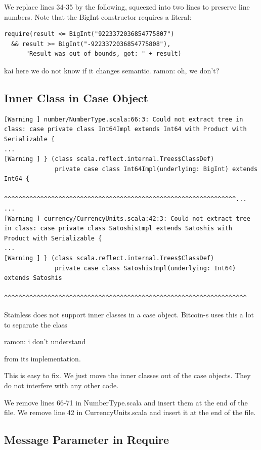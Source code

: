 \documentclass[runningheads]{llncs}
\newcommand{\todo}[1]{{\par \color{red}#1}}
\begin{document}
We replace lines 34-35 by the following, squeezed into two lines to
preserve line numbers. Note that the BigInt constructor requires a
literal:

\begin{lstlisting}[style=scala]
require(result <= BigInt("9223372036854775807")  
  && result >= BigInt("-9223372036854775808"),
      "Result was out of bounds, got: " + result)
\end{lstlisting}


\todo{kai here we do not know if it changes semantic. ramon: oh, we don't?}



\subsection{Inner Class in Case Object}

\begin{lstlisting}[style=stainless]
[Warning ] number/NumberType.scala:66:3: Could not extract tree in class: case private class Int64Impl extends Int64 with Product with Serializable {
...
[Warning ] } (class scala.reflect.internal.Trees$ClassDef)
              private case class Int64Impl(underlying: BigInt) extends Int64 {
              ^^^^^^^^^^^^^^^^^^^^^^^^^^^^^^^^^^^^^^^^^^^^^^^^^^^^^^^^^^^^^^^^...
...
[Warning ] currency/CurrencyUnits.scala:42:3: Could not extract tree in class: case private class SatoshisImpl extends Satoshis with Product with Serializable {
...
[Warning ] } (class scala.reflect.internal.Trees$ClassDef)
              private case class SatoshisImpl(underlying: Int64) extends Satoshis
              ^^^^^^^^^^^^^^^^^^^^^^^^^^^^^^^^^^^^^^^^^^^^^^^^^^^^^^^^^^^^^^^^^^^
\end{lstlisting}

Stainless does not support inner classes in a case object. Bitcoin-s
uses this a lot to separate the class \todo{ramon: i don't understand} from its implementation.

This is easy to fix. We just move the inner classes out of the case objects. They do
not interfere with any other code.

We remove lines 66-71 in NumberType.scala and insert them at the end of the file.
We remove line 42 in CurrencyUnits.scala and insert it at the end of the file.


\subsection{Message Parameter in Require}
\end{document}
